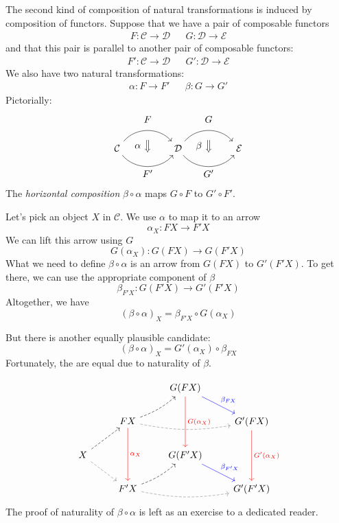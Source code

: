 \documentclass[DaoFP]{subfiles}
\begin{document}
The second kind of composition of natural transformations is induced by composition of functors. Suppose that we have a pair of composable functors
\begin{align*}
 F \colon \mathcal{C} \to \mathcal{D}
&&G \colon \mathcal{D} \to \mathcal{E} 
\end{align*}
and that this pair is parallel to another pair of composable functors:
\begin{align*}
 F' \colon \mathcal{C} \to \mathcal{D}
&& G' \colon \mathcal{D} \to \mathcal{E} 
\end{align*}
We also have two natural transformations:
\begin{align*}
\alpha \colon F \to F'  
&& \beta \colon G \to G' 
\end{align*}
Pictorially:
\[
\begin{tikzcd}[column sep=huge]
\mathcal{C}
  \arrow[bend left=50]{r}[name=U, label=above:$F$]{}
  \arrow[bend right=50]{r}[name=D, label=below:$F'$]{} 
 &
\mathcal{D}
  \arrow[bend left=50]{r}[name=U1, label=above:$G$]{}
  \arrow[bend right=50]{r}[name=D1, label=below:$G'$]{} 
 &
\mathcal{E}
  \arrow[shorten <=10pt,shorten >=10pt,Rightarrow,to path={(U) -- node[label=left:$\alpha$] {} (D)}]{}
  \arrow[shorten <=10pt,shorten >=10pt,Rightarrow,to path={(U1) -- node[label=left:$\beta$] {} (D1)}]{}
\end{tikzcd}
\]
The \emph{horizontal composition} $\beta \circ \alpha$ maps $G \circ F$ to $G' \circ F'$.

Let's pick an object $X$ in $\mathcal{C}$. We use $\alpha$ to map it to an arrow 
\[ \alpha_X \colon F X \to F' X \]
We can lift this arrow using $G$
\[ G (\alpha_X) \colon G (F X) \to G (F' X) \]
What we need to define $\beta \circ \alpha$ is an arrow from $G (F X)$ to $G' (F' X)$. To get there, we can use the appropriate component of $\beta$
\[ \beta_{F' X} \colon G (F' X) \to G' (F' X) \]
Altogether, we have
\[ (\beta \circ \alpha)_X = \beta_{F' X} \circ G (\alpha_X) \]

But there is another equally plausible candidate: 
\[ (\beta \circ \alpha)_X = G'(\alpha_X) \circ \beta_{F X}\]
Fortunately, the are equal due to naturality of $\beta$. 

\[
 \begin{tikzcd}
  && G(F X)
  \arrow[dd, red, "G(\alpha_X)"]
  \arrow[dr, blue, "\beta_{F X}"]
  \\
  & F X
  \arrow[rr, bend right=10, dashed, gray]
  \arrow[ur, bend right=10, dashed]
  \arrow[dd, red, "\alpha_X"]
 && G' (F X)
  \arrow[dd, red, "G'(\alpha_X)"]
 \\
 X
 \arrow[ur, dashed]
 \arrow[dr, gray, dashed]
 && G(F' X)
  \arrow[dr, blue, "\beta_{F' X}"]
 \\
 &F' X
  \arrow[rr, bend right=10, dashed, gray]
 \arrow[ur, bend right=10, dashed]
 && G'(F' X)
\end{tikzcd}
\]
The proof of naturality of $\beta \circ \alpha$ is left as an exercise to a dedicated reader.
\end{document}

